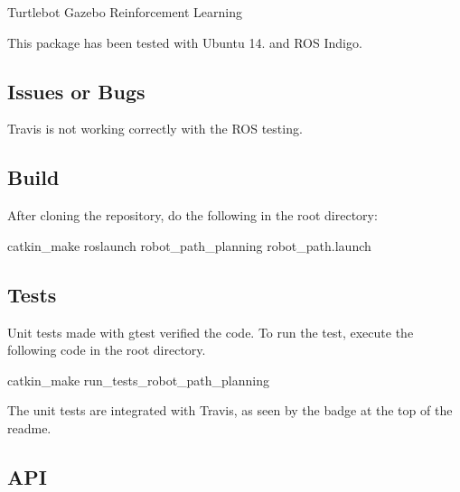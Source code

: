 Turtlebot Gazebo Reinforcement Learning

This package has been tested with Ubuntu 14. and R\-O\-S Indigo.

\subsection*{Issues or Bugs}

Travis is not working correctly with the R\-O\-S testing.

\subsection*{Build}

After cloning the repository, do the following in the root directory\-:

catkin\-\_\-make roslaunch robot\-\_\-path\-\_\-planning robot\-\_\-path.\-launch

\subsection*{Tests}

Unit tests made with gtest verified the code. To run the test, execute the following code in the root directory.

catkin\-\_\-make run\-\_\-tests\-\_\-robot\-\_\-path\-\_\-planning

The unit tests are integrated with Travis, as seen by the badge at the top of the readme.

\subsection*{A\-P\-I}